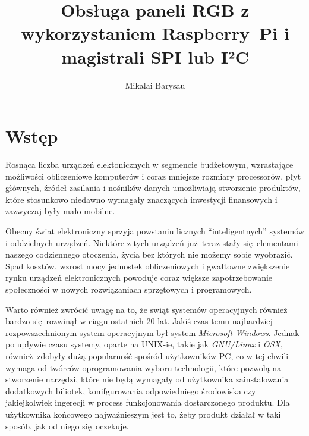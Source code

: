 \documentclass[eng,printmode]{mgr}
\title{Obsługa paneli RGB z wykorzystaniem Raspberry~Pi i magistrali SPI lub I²C}
\author{Mikalai Barysau}
\begin{document}
\renewcommand{\bibname}{Literatura}

\maketitle

\tableofcontents %

\chapter*{Wstęp}

Rosnąca liczba urządzeń elektonicznych w segmencie budżetowym, wzrastające możliwości obliczeniowe komputerów i coraz mniejsze rozmiary processorów, płyt głównych, źródeł zasilania i nośników danych umożliwiają stworzenie produktów, które stosunkowo niedawno wymagały znaczących inwestycji finansowych i zazwyczaj były mało mobilne. 

Obecny świat elektroniczny sprzyja powstaniu licznych ``inteligentnych'' systemów i oddzielnych urządzeń. Niektóre z tych urządzeń już teraz stały się elementami naszego codziennego otoczenia, życia bez których nie możemy sobie wyobrazić. Spad kosztów, wzrost mocy jednostek obliczeniowych i gwałtowne zwiększenie rynku urządzeń elektronicznych powoduje coraz większe zapotrzebowanie społeczności w nowych rozwiązaniach sprzętowych i programowych. 

Warto również zwrócić uwagę na to, że swiąt systemów operacyjnych również bardzo się rozwinął w ciągu ostatnich 20 lat. Jakiś czas temu najbardziej rozpowszechnionym system operacyjnym był system \emph{Microsoft Windows}. Jednak po upływie czasu systemy, oparte na UNIX-ie, takie jak \emph{GNU/Linux} i \emph{OSX}, również zdobyły dużą popularność spośród użytkowników PC, co w tej chwili wymaga od twórców oprogramowania wyboru technologii, które pozwolą na stworzenie narzędzi, które nie będą wymagały od użytkownika zainstalowania dodatkowych biliotek, konifgurowania odpowiedniego środowiska czy jakiejkolwiek ingerecji w process funkcjonowania dostarczonego produktu. Dla użytkownika końcowego najważnieszym jest to, żeby produkt działał w taki sposób, jak od niego się oczekuje. 
\end{document}
